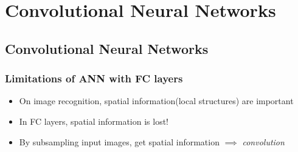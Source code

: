 \section{Convolutional Neural Networks}

\subsection{Convolutional Neural Networks}

\subsubsection*{Limitations of ANN with FC layers}
\begin{itemize}
    \item On image recognition, spatial information(local structures) are important
    \item In FC layers, spatial information is lost!
    \item By subsampling input images, get spatial information $\implies$ \textit{convolution}
\end{itemize}
\begin{figures}
\end{figures}

